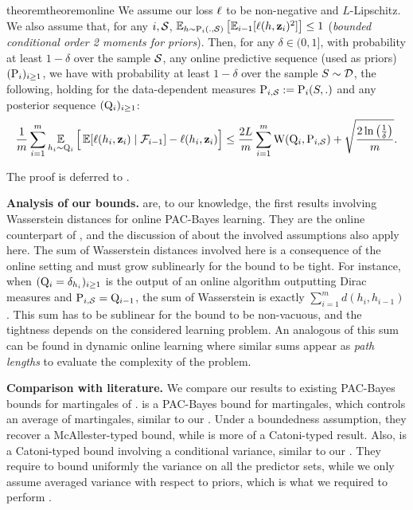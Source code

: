 \begin{restatable}{theorem}{theoremonline}
\label{theorem:online}
We assume our loss $\loss$ to be non-negative and $L$-Lipschitz.
We also assume that, for any $i,\S$, $\EE_{h\sim \P_{i}(.,\S)}\LB \EE_{i-1}[\loss(h,\z_i)^2] \RB \leq 1$ (\emph{bounded conditional order 2 moments for priors}).
Then, for any $\delta\in(0,1]$, with probability at least $1-\delta$ over the sample $\S$, any online predictive sequence (used as priors) $(\P_i)_{i\geq 1}$, we have with probability at least $1-\delta$ over the sample $S\sim\D$, the following, holding for the data-dependent measures $\P_{i,\S}\defeq \P_i(S,.)$ and any posterior sequence $(\Q_i)_{i\geq 1}$:
\begin{align*}
\frac{1}{m}\sum_{i=1}^m \EE_{h_i\sim \Q_{i}} \Big[\EE[\loss(h_i,\z_i) \mid \Fcal_{i-1}] - \loss(h_i,\z_i) \Big]  \le \frac{2L}{m}\sum_{i=1}^{m}\W(\Q_{i}, \P_{i,\S}) + \sqrt{\frac{2\ln\LP\frac{1}{\delta}\RP}{m}}.
\end{align*}
\end{restatable}
The proof is deferred to .

\textbf{Analysis of our bounds.} 
 are, to our knowledge, the first results involving Wasserstein distances for online PAC-Bayes learning.
They are the online counterpart of , and the discussion of  about the involved assumptions also apply here.
The sum of Wasserstein distances involved here is a consequence of the online setting and must grow sublinearly for the bound to be tight.
For instance, when $(\Q_i=\delta_{h_i})_{i\geq1}$ is the output of an online algorithm outputting Dirac measures and $\P_{i,\S}= \Q_{i-1}$, the sum of Wasserstein is exactly $\sum_{i=1}^m d(h_i,h_{i-1})$.
This sum has to be sublinear for the bound to be non-vacuous, and the tightness depends on the considered learning problem. 
An analogous of this sum can be found in dynamic online learning \cite{zinkevich2003online} where similar sums appear as \emph{path lengths} to evaluate the complexity of the problem.  

\textbf{Comparison with literature.}
We compare our results to existing PAC-Bayes bounds for martingales of \cite{seldin2012pac}. 
\cite[Theorem 4]{seldin2012pac} is a PAC-Bayes bound for martingales, which controls an average of martingales, similar to our .
Under a boundedness assumption, they recover a McAllester-typed bound, while  is more of a Catoni-typed result.
Also, \cite[Theorem 7]{seldin2012pac} is a Catoni-typed bound involving a conditional variance, similar to our .
They require to bound uniformly the variance on all the predictor sets, while we only assume averaged variance with respect to priors, which is what we required to perform .

